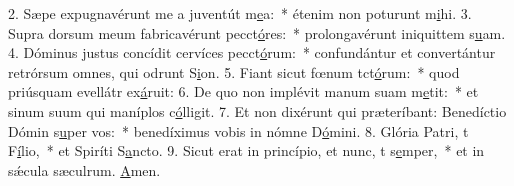 2. Sæpe expugnavérunt me a juventút m\uline{e}a:~* étenim non poturunt m\uline{i}hi.
3. Supra dorsum meum fabricavérunt pecct\uline{ó}res:~* prolongavérunt iniquittem s\uline{u}am.
4. Dóminus justus concídit cervíces pecct\uline{ó}rum:~* confundántur et convertántur retrórsum omnes, qui odrunt S\uline{i}on.
5. Fiant sicut fœnum tct\uline{ó}rum:~* quod priúsquam evellátr ex\uline{á}ruit:
6. De quo non implévit manum suam  m\uline{e}tit:~* et sinum suum qui maníplos c\uline{ó}lligit.
7. Et non dixérunt qui præteríbant: Benedíctio Dómin s\uline{u}per vos:~* benedíximus vobis in nómne D\uline{ó}mini.
8. Glória Patri, t F\uline{í}lio,~* et Spiríti S\uline{a}ncto.
9. Sicut erat in princípio, et nunc, t s\uline{e}mper,~* et in sǽcula sæculrum. \uline{A}men.
